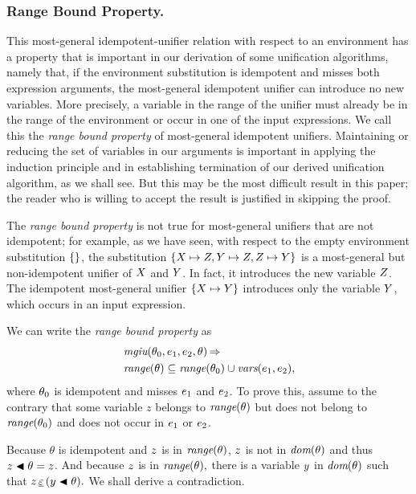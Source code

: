 \documentclass[runningheads]{llncs}
\DeclareMathOperator{\uimplies}{\Rightarrow}
\DeclareMathOperator{\mgiu}{\emph{mgiu}}
\begin{document}
 \subsubsection{Range Bound Property.}\label{rprop}  
 This most-general idempotent-unifier relation with respect to an environment has a property that is important in our derivation of some unification algorithms, namely that, if the environment substitution is  idempotent and misses both expression arguments, the most-general idempotent unifier can introduce no new variables. More precisely, a variable in the range of the unifier must already be in the range of the environment or occur in one of the input expressions.  We call this the \emph{range bound property} of most-general idempotent unifiers.  Maintaining or reducing the set of variables in our arguments is important in applying the induction principle and in establishing termination of our derived unification algorithm, as we shall see. But this may be the most difficult result in this paper; the reader who is willing to accept the result is justified in skipping the proof.
   
   The \emph{range bound property} is not true for most-general unifiers that are not idempotent;  for example, as we have seen, with respect to the empty environment substitution  $\{\}$, the substitution $\{X \mapsto Z, Y \mapsto Z, Z \mapsto Y\}$ is a most-general but non-idempotent unifier of $X$ and $Y$.  In fact, it introduces the new variable $Z$.  The idempotent most-general unifier $\{X \mapsto Y\}$
  introduces only the variable $Y$, which occurs in an input expression.

   We can write the \emph{range bound property}  as
\begin{align*} 
 &\mgiu(\thet{0}, \e{1}, \e{2}, \theta) \uimplies \\
 &\,\range(\theta) \subseteq \range(\thet{0}) \cup \vars(\e{1}, \e{2}), \end{align*}
 where $\theta_{0}$ is idempotent and misses $e_{1}$ and $e_{2}$.
To prove this, assume to the contrary that some variable $z$ belongs to  $\emph{range}(\theta)$ but does not belong to $\emph{range}(\theta_{0})$ and does not occur in $e_{1}$ or $e_{2}$.  



Because $\theta$ is idempotent and $z$ is in 
$\emph{range}(\theta)$, $z$ is not in $\emph{dom}(\theta)$ and thus $z \blacktriangleleft \theta = z$. And because $z$ is in 
$\emph{range}(\theta),$ there is a variable $y$ in $\emph{dom}(\theta)$ such that $z \, \underline{\varepsilon} \, (y \blacktriangleleft \theta).$  We shall derive a contradiction.
\end{document}
